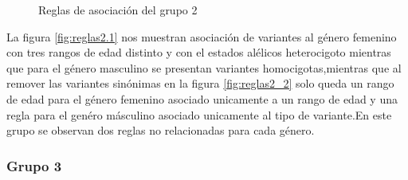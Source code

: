 \begin{figure}[h!]
	\centering
	\caption{Reglas de asociación del grupo 2}\label{fig:reglas2}
\end{figure}

La figura \ref{fig:reglas2.1} nos muestran asociación de variantes al género femenino con tres rangos de edad distinto y con el estados alélicos heterocigoto mientras que para el género masculino se presentan variantes homocigotas,mientras que al remover las variantes sinónimas en la figura \ref{fig:reglas2_2} solo queda un rango de edad para el género femenino asociado unicamente a un rango de edad y una regla para el genéro másculino asociado unicamente al tipo de variante.En este grupo se observan dos reglas no relacionadas para cada género.

\subsubsection*{Grupo 3}

